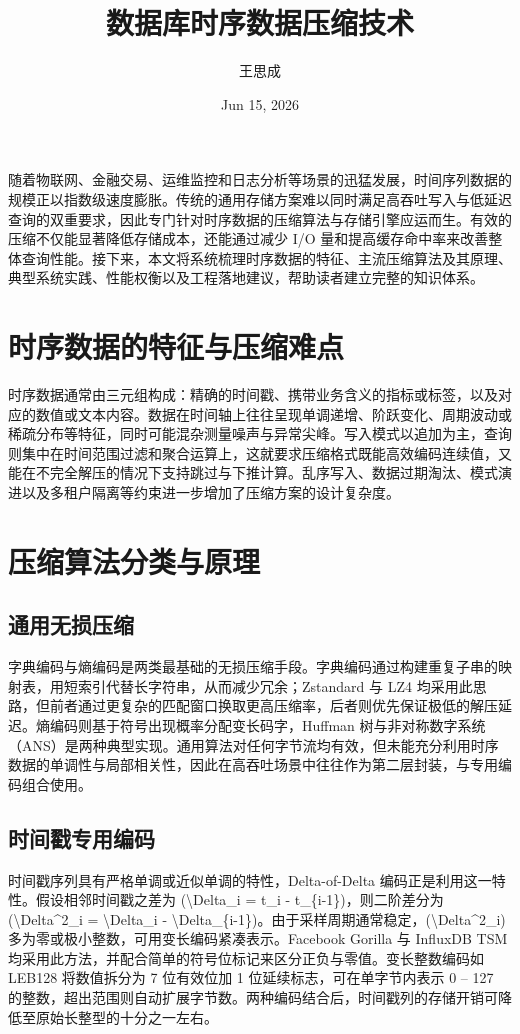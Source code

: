 \title{数据库时序数据压缩技术}
\author{王思成}
\date{Jun 15, 2026}
\maketitle
随着物联网、金融交易、运维监控和日志分析等场景的迅猛发展，时间序列数据的规模正以指数级速度膨胀。传统的通用存储方案难以同时满足高吞吐写入与低延迟查询的双重要求，因此专门针对时序数据的压缩算法与存储引擎应运而生。有效的压缩不仅能显著降低存储成本，还能通过减少 I/O 量和提高缓存命中率来改善整体查询性能。接下来，本文将系统梳理时序数据的特征、主流压缩算法及其原理、典型系统实践、性能权衡以及工程落地建议，帮助读者建立完整的知识体系。\par
\chapter{时序数据的特征与压缩难点}
时序数据通常由三元组构成：精确的时间戳、携带业务含义的指标或标签，以及对应的数值或文本内容。数据在时间轴上往往呈现单调递增、阶跃变化、周期波动或稀疏分布等特征，同时可能混杂测量噪声与异常尖峰。写入模式以追加为主，查询则集中在时间范围过滤和聚合运算上，这就要求压缩格式既能高效编码连续值，又能在不完全解压的情况下支持跳过与下推计算。乱序写入、数据过期淘汰、模式演进以及多租户隔离等约束进一步增加了压缩方案的设计复杂度。\par
\chapter{压缩算法分类与原理}
\section{通用无损压缩}
字典编码与熵编码是两类最基础的无损压缩手段。字典编码通过构建重复子串的映射表，用短索引代替长字符串，从而减少冗余；Zstandard 与 LZ4 均采用此思路，但前者通过更复杂的匹配窗口换取更高压缩率，后者则优先保证极低的解压延迟。熵编码则基于符号出现概率分配变长码字，Huffman 树与非对称数字系统（ANS）是两种典型实现。通用算法对任何字节流均有效，但未能充分利用时序数据的单调性与局部相关性，因此在高吞吐场景中往往作为第二层封装，与专用编码组合使用。\par
\section{时间戳专用编码}
时间戳序列具有严格单调或近似单调的特性，Delta-of-Delta 编码正是利用这一特性。假设相邻时间戳之差为 (\textbackslash{}Delta\_{}i = t\_{}i - t\_{}\{{}i-1\}{})，则二阶差分为 (\textbackslash{}Delta\^{}2\_{}i = \textbackslash{}Delta\_{}i - \textbackslash{}Delta\_{}\{{}i-1\}{})。由于采样周期通常稳定，(\textbackslash{}Delta\^{}2\_{}i) 多为零或极小整数，可用变长编码紧凑表示。Facebook Gorilla 与 InfluxDB TSM 均采用此方法，并配合简单的符号位标记来区分正负与零值。变长整数编码如 LEB128 将数值拆分为 7 位有效位加 1 位延续标志，可在单字节内表示 0 – 127 的整数，超出范围则自动扩展字节数。两种编码结合后，时间戳列的存储开销可降低至原始长整型的十分之一左右。\par
